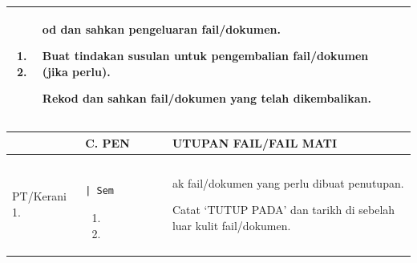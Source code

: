 \documentclass[
]{article}
\begin{document}
\begin{longtable}[]{@{}lll@{}}
\begin{minipage}[t]{0.30\columnwidth}
\begin{enumerate}
\def\labelenumi{\arabic{enumi}.}
\setcounter{enumi}{6}
\item
\item
\end{enumerate}\strut
\end{minipage} & \begin{minipage}[t]{0.30\columnwidth}\raggedright
od dan sahkan pengeluaran fail/dokumen.

Buat tindakan susulan untuk pengembalian fail/dokumen (jika perlu).

Rekod dan sahkan fail/dokumen yang telah dikembalikan.\strut
\end{minipage}\tabularnewline
\bottomrule
\end{longtable}

\begin{longtable}[]{@{}lll@{}}
\toprule
\begin{minipage}[b]{0.30\columnwidth}\raggedright
\strut
\end{minipage} & \begin{minipage}[b]{0.30\columnwidth}\raggedright
C. \textbar{} PEN\strut
\end{minipage} & \begin{minipage}[b]{0.30\columnwidth}\raggedright
UTUPAN FAIL/FAIL MATI\strut
\end{minipage}\tabularnewline
\midrule
\endhead
\begin{minipage}[t]{0.30\columnwidth}\raggedright
PT/Kerani \textbar{} 1.\strut
\end{minipage} & \begin{minipage}[t]{0.30\columnwidth}\raggedright
\begin{verbatim}
              | Sem
\end{verbatim}

\begin{enumerate}
\def\labelenumi{\arabic{enumi}.}
\setcounter{enumi}{1}
\item
\item
\end{enumerate}\strut
\end{minipage} & \begin{minipage}[t]{0.30\columnwidth}\raggedright
ak fail/dokumen yang perlu dibuat penutupan.

Catat `TUTUP PADA' dan tarikh di sebelah luar kulit fail/dokumen.


\end{minipage}
\end{longtable}
\end{document}
